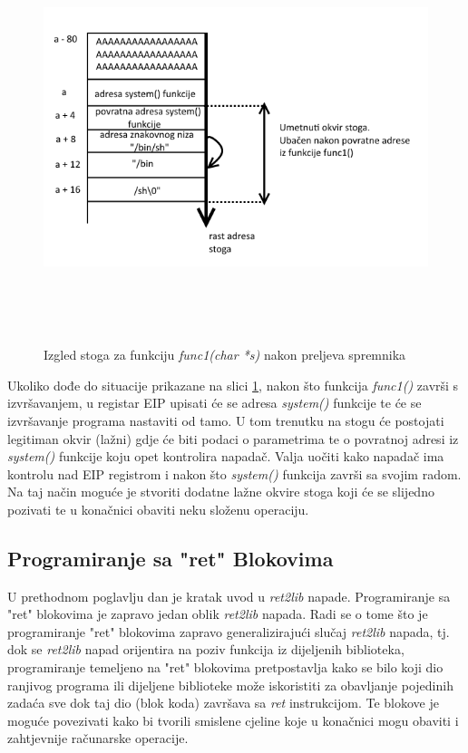 \documentclass[times, utf8, diplomski, numeric]{fer}
\begin{document}
\begin{figure}[!htb]
\centering
\setlength\fboxsep{0pt}
\setlength\fboxrule{0.5pt}
\includegraphics[width=13cm, height=12cm]{slike/ret2lib}
\caption{Izgled stoga za funkciju \emph{func1(char *s)} nakon preljeva spremnika}
\label{fig:ret2lib} 
\end{figure}
Ukoliko dođe do situacije prikazane na slici \ref{fig:ret2lib}, nakon što funkcija \emph{func1()} završi s izvršavanjem, u registar EIP upisati će se adresa \emph{system()} funkcije te će se izvršavanje programa nastaviti od tamo. U tom trenutku na stogu će postojati legitiman okvir (lažni) gdje će biti podaci o parametrima te o povratnoj adresi iz \emph{system()} funkcije koju opet kontrolira napadač. Valja uočiti kako napadač ima kontrolu nad EIP registrom i nakon što \emph{system()} funkcija završi sa svojim radom. Na taj način moguće je stvoriti dodatne lažne okvire stoga koji će se slijedno pozivati te u konačnici obaviti neku složenu operaciju. 

\subsection{Programiranje sa "ret" Blokovima}
\label{sct:rop2}
U prethodnom poglavlju dan je kratak uvod u \emph{ret2lib} napade. Programiranje sa "ret" blokovima je zapravo jedan oblik \emph{ret2lib} napada. Radi se o tome što je programiranje "ret" blokovima zapravo generalizirajući slučaj \emph{ret2lib} napada, tj. dok se \emph{ret2lib} napad orijentira na poziv funkcija iz dijeljenih biblioteka, programiranje temeljeno na "ret" blokovima pretpostavlja kako se bilo koji dio ranjivog programa ili dijeljene biblioteke može iskoristiti za obavljanje pojedinih zadaća sve dok taj dio (blok koda) završava sa \emph{ret} instrukcijom. Te blokove je moguće povezivati kako bi tvorili smislene cjeline koje u konačnici mogu obaviti i zahtjevnije računarske operacije.
\end{document}
